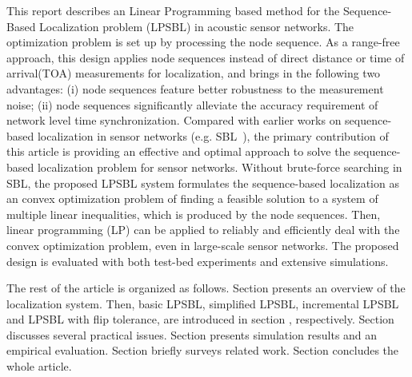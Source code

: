 This report describes an Linear Programming based method
for the Sequence-Based Localization problem (LPSBL)  in acoustic sensor networks.
The optimization problem is set up by processing the node sequence. 
As a range-free approach, this design applies node sequences instead of direct distance
or time of arrival(TOA) measurements for localization, and brings in the following two advantages: (i) node sequences feature better
robustness to the measurement noise; (ii) node sequences significantly alleviate the accuracy requirement of network level time synchronization. 
Compared with earlier works on sequence-based localization in sensor
networks (e.g. SBL~\cite{yedavalli2008sequence}), the primary contribution
of this article is providing an effective and optimal approach
to solve the sequence-based localization problem for sensor networks. 
Without brute-force searching in SBL, the proposed LPSBL system formulates the
sequence-based localization as an convex optimization problem
of finding a feasible solution to a system of multiple linear
inequalities, which is produced by the node sequences.
Then, linear programming (LP) can be applied to reliably and efficiently deal with the convex optimization problem,
even in large-scale sensor networks. 
The proposed design is evaluated with both test-bed experiments and extensive simulations. 


The rest of the article is organized as follows. 
Section \uppercase\expandafter{} presents an overview of the  localization system.
Then, basic LPSBL, simplified LPSBL, incremental LPSBL and LPSBL with flip tolerance, are introduced in section \uppercase\expandafter{}, respectively.
Section \uppercase\expandafter{} discusses several practical issues.
Section \uppercase\expandafter{} presents simulation results and an empirical evaluation. Section \uppercase\expandafter{} briefly surveys related work.
Section \uppercase\expandafter{} concludes the whole article.



